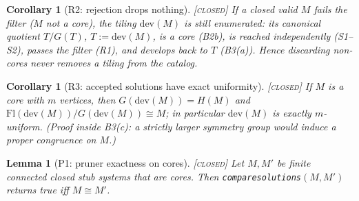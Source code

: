 \documentclass[11pt]{article}
\newtheorem{lemma}[theorem]{Lemma}
\newtheorem{corollary}[theorem]{Corollary}
\theoremstyle{definition}
\newcommand{\CLOSED}{\textnormal{\textsc{[closed]}}}
\newcommand{\Flags}{\mathrm{Fl}}
\newcommand{\dev}{\mathrm{dev}}
\begin{document}
\begin{corollary}[R2: rejection drops nothing]\label{cor:R2} \CLOSED\;
If a closed valid $M$ fails the filter ($M$ not a core), the tiling $\dev(M)$ is still
enumerated: its canonical quotient $T/G(T)$, $T := \dev(M)$, is a core (B2b), is reached
independently (S1--S2), passes the filter (R1), and develops back to $T$ (B3(a)). Hence
discarding non-cores never removes a tiling from the catalog.
\end{corollary}

\begin{corollary}[R3: accepted solutions have exact uniformity]\label{cor:R3} \CLOSED\;
If $M$ is a core with $m$ vertices, then $G(\dev(M)) = H(M)$ and
$\Flags(\dev(M))/G(\dev(M)) \cong M$; in particular $\dev(M)$ is exactly $m$-uniform.
(Proof inside B3(c): a strictly larger symmetry group would induce a proper congruence
on $M$.)
\end{corollary}

\begin{lemma}[P1: pruner exactness on cores]\label{lem:P1} \CLOSED\;
Let $M, M'$ be finite connected closed stub systems that are cores. Then
\texttt{comparesolutions}$(M, M')$ returns true iff $M \cong M'$.
\end{lemma}
\end{document}
